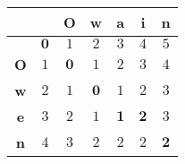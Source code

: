 \begin{tabular}{c|c|c|c|c|c|c|}
    &   & \textbf{O} & \textbf{w} & \textbf{a} & \textbf{i} & \textbf{n}  \\\hline
    & $\bm{0}$ & $1$ & $2$ & $3$ & $4$ & $5$ \\\hline
    \textbf{O} & $1$ & $\bm{0}$ & $1$ & $2$ & $3$ & $4$ \\\hline
    \textbf{w} & $2$ & $1$ & $\bm{0}$ & $1$ & $2$ & $3$ \\\hline
    \textbf{e} & $3$ & $2$ & $1$ & $\bm{1}$ & $\bm{2}$ & $3$ \\\hline
    \textbf{n} & $4$ & $3$ & $2$ & $2$ & $2$ & $\bm{2}$ \\\hline
\end{tabular}